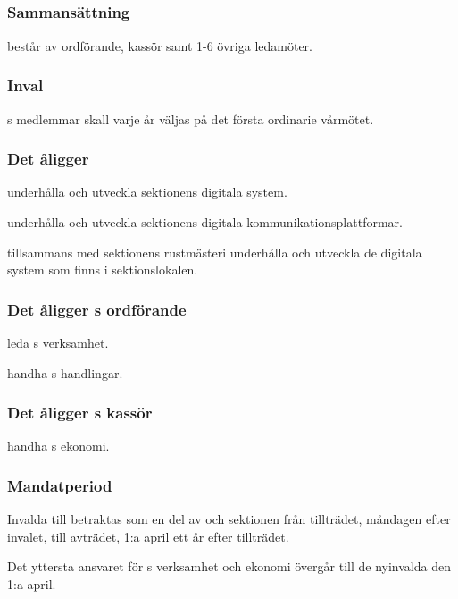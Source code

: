 \subsection{\DIGITFULL}
\subsubsection{Sammansättning}
\DIGIT{} består av ordförande, kassör samt 1-6 övriga ledamöter.

\subsubsection{Inval}
\DIGIT{}s medlemmar skall varje år väljas på det första ordinarie vårmötet.

\subsubsection{Det åligger \DIGIT}
\begin{att}
	\item underhålla och utveckla sektionens digitala system.
	\item underhålla och utveckla sektionens digitala kommunikationsplattformar.
	\item tillsammans med sektionens rustmästeri underhålla och utveckla de digitala system som finns i sektionslokalen.
\end{att}

\subsubsection{Det åligger \DIGIT{}s ordförande}
\begin{att}
	\item leda \DIGIT{}s verksamhet.
	\item handha \DIGIT{}s handlingar.
\end{att}

\subsubsection{Det åligger \DIGIT{}s kassör}
\begin{att}
	\item handha \DIGIT{}s ekonomi.
\end{att}

\subsubsection{Mandatperiod}
Invalda till \DIGIT{} betraktas som en del av \DIGIT{} och sektionen från tillträdet, måndagen efter invalet, till avträdet, 1:a april ett år efter tillträdet.

Det yttersta ansvaret för \DIGIT{}s verksamhet och ekonomi övergår till de nyinvalda den 1:a april.


